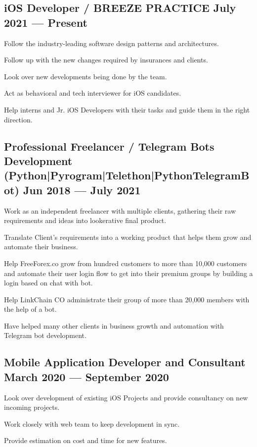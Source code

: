 \documentclass[letter,10pt]{article}
\begin{document}
\subsection{{iOS Developer / BREEZE PRACTICE \hfill July 2021 --- Present}}
\begin{zitemize}
\item Follow the industry-leading software design patterns and architectures.
\item Follow up with the new changes required by insurances and clients.
\item Look over new developments being done by the team.
\item Act as behavioral and tech interviewer for iOS candidates.
\item Help interns and Jr. iOS Developers with their tasks and guide them in the right direction.
\end{zitemize}

\subsection{{Professional Freelancer / Telegram Bots Development (Python|Pyrogram|Telethon|PythonTelegramBot) \hfill Jun 2018 --- July 2021}}
\begin{zitemize}
\item Work as an independent freelancer with multiple clients, gathering their raw requirements and ideas into lookerative final product.
\item Translate Client's requirements into a working product that helps them grow and automate their business.
\item Help FreeForex.co grow from hundred customers to more than 10,000 customers and automate their user login flow to get into their premium groups by building a login based on chat with bot.
\item Help LinkChain CO administrate their group of more than 20,000 members with the help of a bot.
\item Have helped many other clients in business growth and automation with Telegram bot development.
\end{zitemize}

\subsection{{Mobile Application Developer and Consultant \hfill March 2020 --- September 2020}}
\begin{zitemize}
\item Look over development of existing iOS Projects and provide consultancy on new incoming projects.
\item Work closely with web team to keep development in sync.
\item Provide estimation on cost and time for new features.
\end{zitemize}
\end{document}
